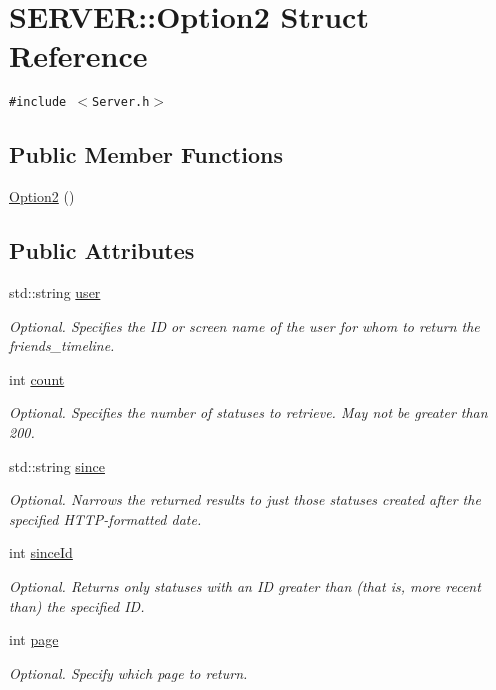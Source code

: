 \hypertarget{structSERVER_1_1Option2}{
\section{SERVER::Option2 Struct Reference}
\label{structSERVER_1_1Option2}
}
{\tt \#include $<$Server.h$>$}

\subsection*{Public Member Functions}
\begin{CompactItemize}
\item 
\hyperlink{structSERVER_1_1Option2_d97991e3af57fa03d4763ff00fee831c}{Option2} ()
\end{CompactItemize}
\subsection*{Public Attributes}
\begin{CompactItemize}
\item 
std::string \hyperlink{structSERVER_1_1Option2_cc4ff418bf1cb85987457878ecf58840}{user}
\begin{CompactList}\small\item\em Optional. Specifies the ID or screen name of the user for whom to return the friends\_\-timeline. \item\end{CompactList}\item 
int \hyperlink{structSERVER_1_1Option2_49cccf8e4da75bacccc85eb3ea4257e7}{count}
\begin{CompactList}\small\item\em Optional. Specifies the number of statuses to retrieve. May not be greater than 200. \item\end{CompactList}\item 
std::string \hyperlink{structSERVER_1_1Option2_a5f812a1c4b4a757204e187a90a99d92}{since}
\begin{CompactList}\small\item\em Optional. Narrows the returned results to just those statuses created after the specified HTTP-formatted date. \item\end{CompactList}\item 
int \hyperlink{structSERVER_1_1Option2_42cf95d44c8dee885c20570746b52cfa}{sinceId}
\begin{CompactList}\small\item\em Optional. Returns only statuses with an ID greater than (that is, more recent than) the specified ID. \item\end{CompactList}\item 
int \hyperlink{structSERVER_1_1Option2_e5527a71b27b55dfbf1dc2a0847a1b98}{page}
\begin{CompactList}\small\item\em Optional. Specify which page to return. \item\end{CompactList}\end{CompactItemize}


